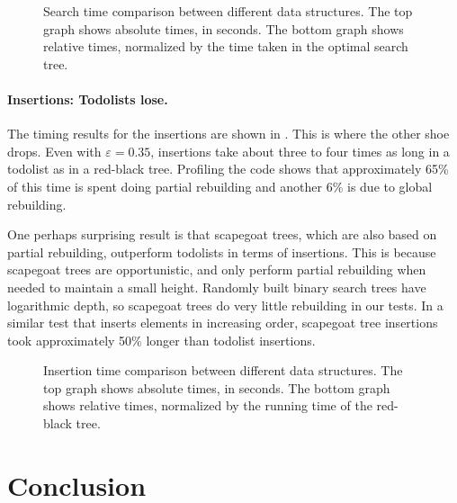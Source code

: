 \documentclass{patmorin}
\newcommand{\eps}{\varepsilon}
\begin{document}
\begin{figure}
  \centering{}
  \centering{}
  \caption{Search time comparison between different data structures. The top graph shows absolute times, in seconds. The bottom graph shows relative times, normalized by the time taken in the optimal search tree.}
\end{figure}

\paragraph{Insertions: Todolists lose.}
The timing results for the insertions are shown in
. This is where the other shoe drops.  Even with
$\eps=0.35$, insertions take about three to four times as long in
a todolist as in a red-black tree.  Profiling the code shows that
approximately 65\% of this time is spent doing partial rebuilding and
another 6\% is due to global rebuilding.

One perhaps surprising result is that scapegoat trees, which are also
based on partial rebuilding, outperform todolists in terms of insertions.
This is because scapegoat trees are opportunistic, and only perform
partial rebuilding when needed to maintain a small height.  Randomly built
binary search trees have logarithmic depth, so scapegoat trees do very
little rebuilding in our tests.  In a similar test that inserts elements
in increasing order, scapegoat tree insertions took approximately 50\%
longer than todolist insertions.


\begin{figure}
  \centering{}
  \centering{}
  \caption{Insertion time comparison between different data structures. The top graph shows absolute times, in seconds. The bottom graph shows relative times, normalized by the running time of the red-black tree.}
\end{figure}



\section{Conclusion}
\end{document}
